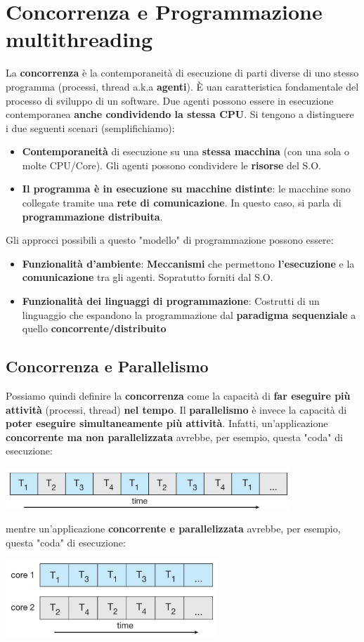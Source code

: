\documentclass[12pt]{article}
\begin{document}
\section{Concorrenza e Programmazione multithreading}
La \textbf{concorrenza} è la contemporaneità di esecuzione di parti diverse di uno stesso programma (processi, thread a.k.a \textbf{agenti}). È uan caratteristica fondamentale del processo di sviluppo di un software. Due agenti possono essere in esecuzione contemporanea \textbf{anche condividendo la stessa CPU}. Si tengono a distinguere i due seguenti scenari (semplifichiamo):
\begin{itemize}
    \item \textbf{Contemporaneità} di esecuzione su una \textbf{stessa macchina} (con una sola o molte CPU/Core). Gli agenti possono condividere le \textbf{risorse} del S.O.
    \item \textbf{Il programma è in esecuzione su macchine distinte}: le macchine sono collegate tramite una \textbf{rete di comunicazione}. In questo caso, si parla di \textbf{programmazione distribuita}.
\end{itemize}
Gli approcci possibili a questo "modello" di programmazione possono essere:
\begin{itemize}
    \item \textbf{Funzionalità d'ambiente}: \textbf{Meccanismi} che permettono \textbf{l'esecuzione} e la \textbf{comunicazione} tra gli agenti. Sopratutto forniti dal S.O.
    \item \textbf{Funzionalità dei linguaggi di programmazione}: Costrutti di un linguaggio che espandono la programmazione dal \textbf{paradigma sequenziale} a quello \textbf{concorrente/distribuito}
\end{itemize}
\subsection{Concorrenza e Parallelismo}
Possiamo quindi definire la \textbf{concorrenza} come la capacità di \textbf{far eseguire più attività} (processi, thread) \textbf{nel tempo}. Il \textbf{parallelismo} è invece la capacità di \textbf{poter eseguire simultaneamente più attività}. Infatti, un'applicazione \textbf{concorrente ma non parallelizzata} avrebbe, per esempio, questa "coda" di esecuzione:
\begin{center}
    \includegraphics[width = 0.80\textwidth]{Images/45.PNG}
\end{center}
mentre un'applicazione \textbf{concorrente e parallelizzata} avrebbe, per esempio, questa "coda" di esecuzione:
\begin{center}
    \includegraphics[width = 0.60\textwidth]{Images/46.PNG}
\end{center}
\end{document}
